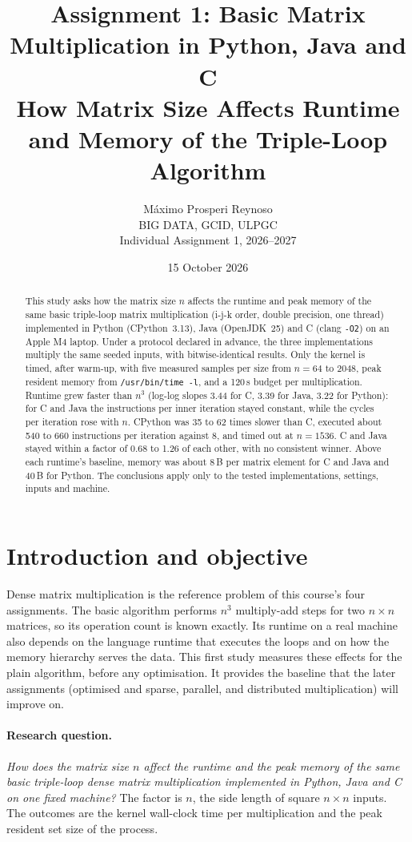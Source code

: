 \documentclass[11pt,a4paper]{article}
\title{\textbf{Assignment 1: Basic Matrix Multiplication in Python, Java and C}\\[4pt]
\large How Matrix Size Affects Runtime and Memory of the Triple-Loop Algorithm}
\author{Máximo Prosperi Reynoso\\[2pt]
\small BIG DATA, GCID, ULPGC\\
\small Individual Assignment 1, 2026--2027\\[2pt]
\small \repourl}
\date{15 October 2026}
\begin{document}
\maketitle

\begin{abstract}
\noindent
This study asks how the matrix size $n$ affects the runtime and peak memory of
the same basic triple-loop matrix multiplication (i-j-k order, double precision,
one thread) implemented in Python (CPython~3.13), Java (OpenJDK~25) and C (clang
\texttt{-O2}) on an Apple M4 laptop. Under a protocol declared in advance, the
three implementations multiply the same seeded inputs, with bitwise-identical
results. Only the kernel is timed, after warm-up, with five measured samples per
size from $n=64$ to $2048$, peak resident memory from \texttt{/usr/bin/time -l},
and a 120\,s budget per multiplication. Runtime grew faster than $n^3$ (log-log
slopes 3.44 for C, 3.39 for Java, 3.22 for Python): for C and Java the
instructions per inner iteration stayed constant, while the cycles per
iteration rose with $n$. CPython was
35 to 62 times slower than C, executed about 540 to 660 instructions per
iteration against 8, and timed out at $n=1536$. C and Java stayed within a factor
of 0.68 to 1.26 of each other, with no consistent winner. Above each runtime's
baseline, memory was about 8\,B per matrix element for C and Java and 40\,B for
Python. The conclusions apply only to the tested implementations, settings,
inputs and machine.
\end{abstract}

\section{Introduction and objective}

Dense matrix multiplication is the reference problem of this course's four
assignments. The basic algorithm performs $n^3$ multiply-add steps for two
$n\times n$ matrices, so its operation count is known exactly. Its runtime on a
real machine also depends on the language runtime that executes the loops and on
how the memory hierarchy serves the data. This first study measures these
effects for the plain algorithm, before any optimisation. It provides the
baseline that the later assignments (optimised and sparse, parallel, and
distributed multiplication) will improve on.

\paragraph{Research question.} \emph{How does the matrix size $n$ affect the
runtime and the peak memory of the same basic triple-loop dense matrix
multiplication implemented in Python, Java and C on one fixed machine?} The
factor is $n$, the side length of square $n\times n$ inputs. The outcomes are the
kernel wall-clock time per multiplication and the peak resident set size of the
process.
\end{document}
